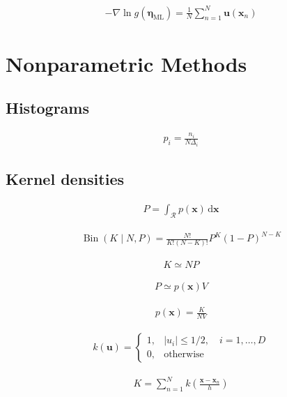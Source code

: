 \documentclass{article}
\begin{document}
\begin{align*}
-\nabla \ln g\left(\boldsymbol{\eta}_{\mathrm{ML}}\right)=\frac{1}{N} \sum_{n=1}^{N} \mathbf{u}\left(\mathbf{x}_{n}\right)
\tag{3.174}
\end{align*}

\section{Nonparametric Methods}

\subsection{Histograms}

\begin{align*}
p_{i} = \frac{n_{i}}{N \Delta_{i}} 
\tag{3.175}
\end{align*}

\subsection{Kernel densities}

\begin{align*}
P = \int_{\mathcal{R}} p(\mathbf{x}) \, \mathrm{d} \mathbf{x} 
\tag{3.176}
\end{align*}

\begin{align*}
\operatorname{Bin}(K \mid N, P) = \frac{N!}{K!(N-K)!} P^{K} (1-P)^{N-K} 
\tag{3.177}
\end{align*}

\begin{align*}
K \simeq N P 
\tag{3.178}
\end{align*}

\begin{align*}
P \simeq p(\mathbf{x}) V 
\tag{3.179}
\end{align*}

\begin{align*}
p(\mathbf{x}) = \frac{K}{N V} 
\tag{3.180}
\end{align*}

\begin{align*}
k(\mathbf{u}) = \begin{cases} 
1, & |u_{i}| \leqslant 1 / 2, \quad i = 1, \ldots, D \\
0, & \text{otherwise} 
\end{cases}
\tag{3.181}
\end{align*}

\begin{align*}
K = \sum_{n=1}^{N} k\left( \frac{\mathbf{x} - \mathbf{x}_n}{h} \right) 
\tag{3.182}
\end{align*}
\end{document}
